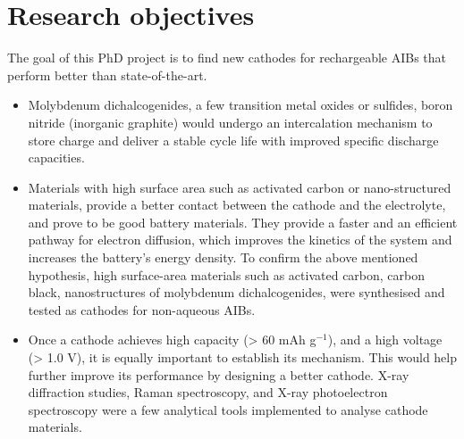\section{Research objectives}
The goal of this PhD project is to find new cathodes for rechargeable AIBs that perform better than state-of-the-art. 
\begin{itemize}
    \item Molybdenum dichalcogenides, a few transition metal oxides or sulfides, boron nitride (inorganic graphite) would undergo an intercalation mechanism to store charge and deliver a stable cycle life with improved specific discharge capacities. 
    
    \item Materials with high surface area such as activated carbon or nano-structured materials, provide a better contact between the cathode and the electrolyte, and prove to be good battery materials. They provide a faster and an efficient pathway for electron diffusion, which improves the kinetics of the system and increases the battery's energy density. To confirm the above mentioned hypothesis, high surface-area materials such as activated carbon, carbon black, nanostructures of molybdenum dichalcogenides, were synthesised and tested as cathodes for non-aqueous AIBs.
    
    \item Once a cathode achieves high capacity (> 60 mAh g$^{-1}$), and a high voltage (> 1.0 V), it is equally important to establish its mechanism. This would help further improve its performance by designing a better cathode. X-ray diffraction studies, Raman spectroscopy, and X-ray photoelectron spectroscopy were a few analytical tools implemented to analyse cathode materials. 

\end{itemize}






